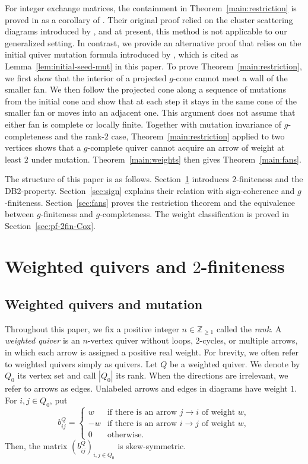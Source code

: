 \documentclass[11pt,reqno]{amsart}
\numberwithin{equation}{section}
\theoremstyle{definition}
\theoremstyle{plain}
\begin{document}
	For integer exchange matrices, the containment in Theorem~\ref{main:restriction} is proved in \cite[proof of Theorem~8]{CL20} as a corollary of \cite[Theorem~33]{Mu16}. Their original proof relied on the cluster scattering diagrams introduced by \cite{GHKK18}, and at present, this method is not applicable to our generalized setting. In contrast, we provide an alternative proof that relies on the initial quiver mutation formula introduced by \cite{NZ12}, which is cited as Lemma~\ref{lem:initial-seed-mut} in this paper. To prove Theorem~\ref{main:restriction}, we first show that the interior of a projected $g$-cone cannot meet a wall of the smaller fan. We then follow the projected cone along a sequence of mutations from the initial cone and show that at each step it stays in the same cone of the smaller fan or moves into an adjacent one. This argument does not assume that either fan is complete or locally finite. Together with mutation invariance of $g$-completeness and the rank-$2$ case, Theorem~\ref{main:restriction} applied to two vertices shows that a $g$-complete quiver cannot acquire an arrow of weight at least $2$ under mutation. Theorem~\ref{main:weights} then gives Theorem~\ref{main:fans}.
	
  The structure of this paper is as follows.
	Section~\ref{sec:weights} introduces $2$-finiteness and the DB2-property. Section~\ref{sec:sign} explains their relation with sign-coherence and $g$-finiteness. Section~\ref{sec:fans} proves the restriction theorem and the equivalence between $g$-finiteness and $g$-completeness. The weight classification is proved in Section~\ref{sec:pf-2fin-Cox}.

\section{Weighted quivers and \texorpdfstring{$2$}{2}-finiteness}\label{sec:weights}
\subsection{Weighted quivers and mutation}
	Throughout this paper, we fix a positive integer $n \in \mathbb{Z}_{\geq 1}$ called the \emph{rank}. A \emph{weighted quiver} is an $n$-vertex quiver without loops, $2$-cycles, or multiple arrows, in which each arrow is assigned a positive real weight. For brevity, we often refer to weighted quivers simply as quivers. Let $Q$ be a weighted quiver. We denote by $Q_0$ its vertex set and call $|Q_0|$ its rank. When the directions are irrelevant, we refer to arrows as edges. Unlabeled arrows and edges in diagrams have weight $1$. For $i,j\in Q_0$, put
	\[
	b_{ij}^Q=
	\begin{cases}
		w & \text{if there is an arrow $j\to i$ of weight $w$},\\
		-w & \text{if there is an arrow $i\to j$ of weight $w$},\\
		0 & \text{otherwise}.
	\end{cases}
	\]
	Then, the matrix $(b_{ij}^Q)_{i,j\in Q_0}$ is skew-symmetric.
	
\end{document}
